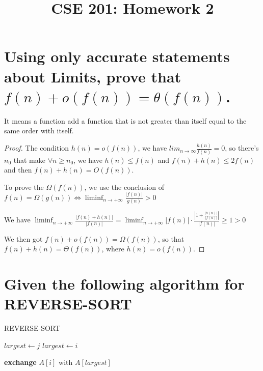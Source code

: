 \documentclass[a4paper]{article}
\title{CSE 201: Homework 2}
\begin{document}
\maketitle
\section{Using only accurate statements about Limits, prove that $f(n)+o(f(n))=\theta(f(n))$.}
It means a function add a function that is not greater than itself equal to the same order with itself.     
\begin{proof}
The condition $h(n)=o (f(n))$, we have $lim_{n\to \infty }\frac{h(n)}{f(n)}=0$, so there's $n_0$ that make $\forall n\geq n_0$, we have $h(n)\leq f(n)$ and $f(n)+h(n)\leq 2 f(n)$ and then $f(n)+h(n)=O(f(n))$.

To prove the $\Omega(f(n))$, we use the conclusion of $f(n)=\Omega(g(n)) \Leftrightarrow \liminf _{n \rightarrow+\infty} \frac{|f(n)|}{g(n)}>0$

We have  $\liminf _{n \rightarrow+\infty} \frac{|f(n)+h(n)|}{|f(n)|}=\liminf _{n \rightarrow+\infty}|f(n)| \cdot \frac{\left|1+\frac{|h(n)|}{|f(n)|}\right|}{|f(n)|} \geq 1>0$

We then got $f(n)+o(f(n))=\Omega(f(n))$, so that $f(n)+h(n)=\Theta(f(n))$, where $h(n)=o(f(n))$.
\end{proof}
\section{Given the following algorithm for REVERSE-SORT}
\begin{algorithm}
    \caption{REVERSE-SORT}\label{alg:cap}
    \begin{algorithmic}[1] 
    \State $largest \gets j$
    \State $largest \gets i$
   
    \EndIf
    \EndFor
    \State \textbf{exchange }$A[i]$ with $A[largest]$
    \EndFor
    \end{algorithmic}
    \end{algorithm}
\end{document}
